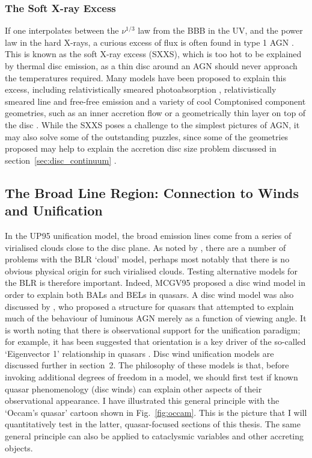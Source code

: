 \subsubsection{The Soft X-ray Excess}
\label{sec:sxxs}

If one interpolates between the $\nu^{1/3}$ law from the BBB in the UV, and the power law
in the hard X-rays, a curious excess of flux is often found
in type 1 AGN \citep[see Fig.~\ref{fig:quasar_sed}, and][]{koratkar1999}. 
This is known as the soft X-ray excess (SXXS), which is too 
hot to be explained by thermal disc emission, as a thin disc around an AGN should
never approach the temperatures required. Many models have been proposed to
explain this excess, including relativistically smeared 
photoabsorption \citep{gierlinskidone2004b,gierlinskidone2006}, 
relativistically smeared line and 
free-free emission \citep{rossfabian2005,crummy2006} 
and a variety of cool Comptonised component geometries, such as an 
inner accretion flow \citep{magdiarz1998,done2012} 
or a geometrically thin layer on top of the disc \citep{januik2001}. 
While the SXXS poses a challenge to
the simplest pictures of AGN, it may also solve some of the outstanding puzzles, 
since some of the geometries proposed may help to explain the 
accretion disc size problem discussed in 
section~\ref{sec:disc_continuum} \citep{gardnerdone2016}.

\subsection{The Broad Line Region: Connection to Winds and Unification}

In the UP95 unification model, the broad emission lines
come from a series of virialised clouds close to the disc plane.
As noted by \citet[][hereafter MCGV95]{MCGV95}, there are a number of problems with
the BLR `cloud' model, perhaps most notably that there is no obvious 
physical origin for such virialised clouds. 
Testing alternative models for the BLR is therefore important.
Indeed, MCGV95 proposed a disc wind model in order to explain both BALs and BELs
in quasars. A disc wind model was also  discussed by \cite{elvis2000}, 
who proposed a structure for quasars that attempted to explain much 
of the behaviour of luminous AGN
merely as a function of viewing angle. It is worth noting that
there is observational support for the unification paradigm; for example,
it has been suggested that orientation is a key driver of the so-called
`Eigenvector 1' relationship in quasars 
\citep{borosongreen,sulentic2000ev1,marziani2001,shenho2014}.
Disc wind unification models are discussed further in section~2.
The philosophy of these models is that, before invoking additional
degrees of freedom in a model, we should first test if known quasar phenomenology 
(disc winds) can explain other aspects of their observational appearance.
I have illustrated this general principle with the `Occam's quasar' 
cartoon shown in Fig.~\ref{fig:occam}. This is the picture that I will
quantitatively test in the latter, quasar-focused sections of this thesis.
The same general principle can also be applied to cataclysmic variables 
and other accreting objects.


